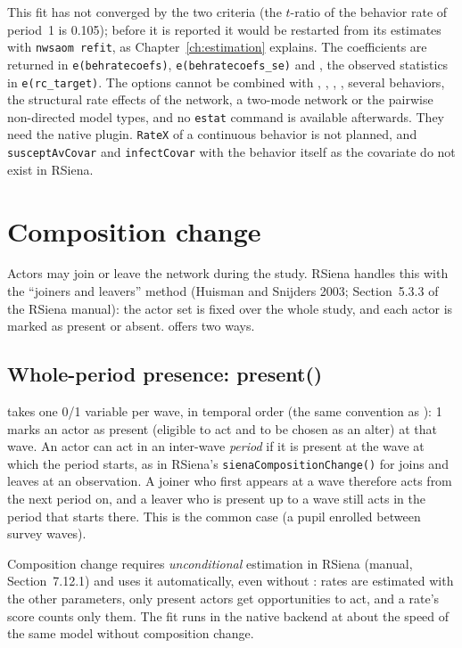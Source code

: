This fit has not converged by the two criteria (the $t$-ratio of the behavior rate of period~1 is 0.105); before it is reported it would be restarted from its estimates with \texttt{nwsaom refit}, as Chapter~\ref{ch:estimation} explains. The coefficients are returned in \texttt{e(behratecoefs)}, \texttt{e(behratecoefs\_se)} and , the observed statistics in \texttt{e(rc\_target)}. The options cannot be combined with , , , , several behaviors, the structural rate effects of the network, a two-mode network or the pairwise non-directed model types, and no \texttt{estat} command is available afterwards. They need the native plugin. \texttt{RateX} of a continuous behavior is not planned, and \texttt{susceptAvCovar} and \texttt{infectCovar} with the behavior itself as the covariate do not exist in RSiena.

\section{Composition change}\label{sec:compchange}

Actors may join or leave the network during the study. RSiena handles this with the ``joiners and leavers'' method (Huisman and Snijders 2003; Section~5.3.3 of the RSiena manual): the actor set is fixed over the whole study, and each actor is marked as present or absent. \nwsaom{} offers two ways.

\subsection{Whole-period presence: present()}

 takes one 0/1 variable per wave, in temporal order (the same convention as ): 1 marks an actor as present (eligible to act and to be chosen as an alter) at that wave. An actor can act in an inter-wave \emph{period} if it is present at the wave at which the period starts, as in RSiena's \texttt{sienaCompositionChange()} for joins and leaves at an observation. A joiner who first appears at a wave therefore acts from the next period on, and a leaver who is present up to a wave still acts in the period that starts there. This is the common case (a pupil enrolled between survey waves).

Composition change requires \emph{unconditional} estimation in RSiena (manual, Section~7.12.1) and \nwsaom{} uses it automatically, even without : rates are estimated with the other parameters, only present actors get opportunities to act, and a rate's score counts only them. The fit runs in the native backend at about the speed of the same model without composition change.

